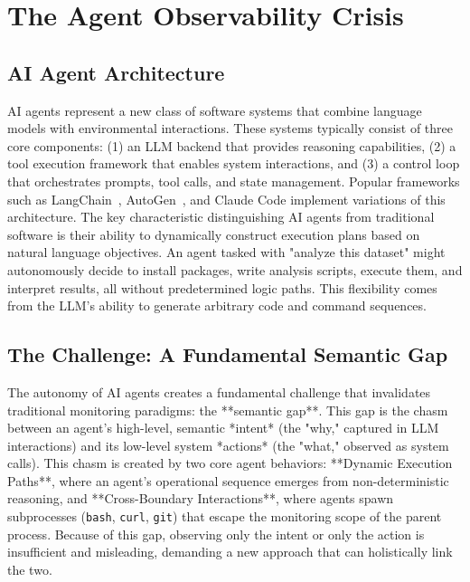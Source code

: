 \section{The Agent Observability Crisis}

\subsection{AI Agent Architecture}
AI agents represent a new class of software systems that combine language models with environmental interactions. These systems typically consist of three core components: (1) an LLM backend that provides reasoning capabilities, (2) a tool execution framework that enables system interactions, and (3) a control loop that orchestrates prompts, tool calls, and state management. Popular frameworks such as LangChain~\cite{langchain}, AutoGen~\cite{autogen}, and Claude Code implement variations of this architecture. The key characteristic distinguishing AI agents from traditional software is their ability to dynamically construct execution plans based on natural language objectives. An agent tasked with "analyze this dataset" might autonomously decide to install packages, write analysis scripts, execute them, and interpret results, all without predetermined logic paths. This flexibility comes from the LLM's ability to generate arbitrary code and command sequences.

\subsection{The Challenge: A Fundamental Semantic Gap}
The autonomy of AI agents creates a fundamental challenge that invalidates traditional monitoring paradigms: the **semantic gap**. This gap is the chasm between an agent's high-level, semantic *intent* (the "why," captured in LLM interactions) and its low-level system *actions* (the "what," observed as system calls). This chasm is created by two core agent behaviors: **Dynamic Execution Paths**, where an agent's operational sequence emerges from non-deterministic reasoning, and **Cross-Boundary Interactions**, where agents spawn subprocesses (\texttt{bash}, \texttt{curl}, \texttt{git}) that escape the monitoring scope of the parent process. Because of this gap, observing only the intent or only the action is insufficient and misleading, demanding a new approach that can holistically link the two.

